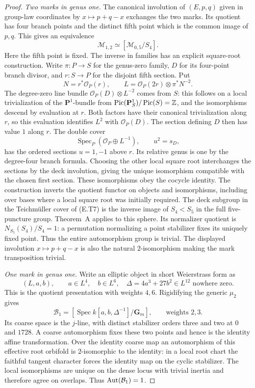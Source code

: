 \begin{proof}
\emph{Two marks in genus one.}
The canonical involution of $(E,p,q)$ given in group-law
coordinates by $x\mapsto p+q-x$ exchanges the two marks.
Its quotient has four branch points and the distinct fifth
point which is the common image of $p,q$.  This gives an
equivalence
\[
       \mathcal M_{1,2}\simeq[\mathcal M_{0,5}/S_4].
 \tag{E.T7}
\]
Here the fifth point is fixed.  The inverse in families has
an explicit square-root construction.  Write
$\pi:P\to S$ for the genus-zero family, $D$ for its four-point
branch divisor, and $r:S\to P$ for the disjoint fifth section.
Put
\[
 N=r^*\mathcal O_P(r),\qquad
 L=\mathcal O_P(2r)\otimes\pi^*N^{-2}.
\]
The degree-zero line bundle
$\mathcal O_P(D)\otimes L^{-2}$ comes from $S$: this follows
on a local trivialization of the $\mathbf P^1$-bundle from
$\operatorname{Pic}(\mathbf P^1_S)/\operatorname{Pic}(S)=\mathbb Z$,
and the isomorphisms descend by evaluation at $r$.
Both factors have their canonical trivialization along $r$,
so this evaluation identifies $L^2$ with $\mathcal O_P(D)$.
The section defining $D$ then has value $1$ along $r$.
The double cover
\[
 \operatorname{Spec}_P(\mathcal O_P\oplus L^{-1}),
 \qquad u^2=s_D,
\]
has the ordered sections $u=1,-1$ above $r$.  Its relative
genus is one by the degree-four branch formula.  Choosing
the other local square root interchanges the sections by
the deck involution, giving the unique isomorphism compatible
with the chosen first section.  These isomorphisms obey the
cocycle identity.  The construction inverts the quotient
functor on objects and isomorphisms, including over bases
where a local square root was initially required.
The deck subgroup in the Teichm\"uller cover of (E.T7) is the
inverse image of $S_4<S_5$ in the full five-puncture group.
Theorem~A applies to this sphere.  Its normalizer quotient is
$N_{S_5}(S_4)/S_4=1$: a permutation normalizing a point
stabilizer fixes its uniquely fixed point.  Thus the entire
automorphism group is trivial.  The displayed involution
$x\mapsto p+q-x$ is also the natural $2$-isomorphism making
the mark transposition trivial.

\emph{One mark in genus one.}
Write an elliptic object in short Weierstrass form as
\[
 (L,a,b),\qquad a\in L^4,\quad b\in L^6,
 \quad\Delta=4a^3+27b^2\in L^{12}\text{ nowhere zero}.
\]
This is the quotient presentation with weights $4,6$.
Rigidifying the generic $\mu_2$ gives
\[
 \mathcal B_1=
 [\operatorname{Spec}k[a,b,\Delta^{-1}]/\mathbf G_m],
       \qquad\text{weights }2,3.
\]
Its coarse space is the $j$-line, with distinct stabilizer
orders three and two at $0$ and $1728$.  A coarse
automorphism fixes these two points and hence is the
identity affine transformation.  Over the identity coarse
map an automorphism of this effective root orbifold is
$2$-isomorphic to the identity: in a local root chart the
faithful tangent character forces the identity map on
the cyclic stabilizer.  The local isomorphisms are unique
on the dense locus with trivial inertia and therefore agree
on overlaps.  Thus $\operatorname{Aut}(\mathcal B_1)=1$.


\end{proof}
